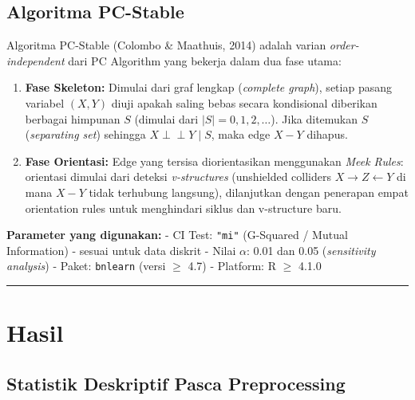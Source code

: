 \documentclass[
  11pt,
]{article}
\begin{document}
\subsection{Algoritma PC-Stable}\label{algoritma-pc-stable}

Algoritma PC-Stable (Colombo \& Maathuis, 2014) adalah varian
\emph{order-independent} dari PC Algorithm yang bekerja dalam dua fase
utama:

\begin{enumerate}
\def\labelenumi{\arabic{enumi}.}
\item
  \textbf{Fase Skeleton:} Dimulai dari graf lengkap (\emph{complete
  graph}), setiap pasang variabel \((X, Y)\) diuji apakah saling bebas
  secara kondisional diberikan berbagai himpunan \(S\) (dimulai dari
  \(|S|=0, 1, 2, \ldots\)). Jika ditemukan \(S\) (\emph{separating set})
  sehingga \(X \perp\!\!\!\perp Y \mid S\), maka edge \(X-Y\) dihapus.
\item
  \textbf{Fase Orientasi:} Edge yang tersisa diorientasikan menggunakan
  \emph{Meek Rules}: orientasi dimulai dari deteksi \emph{v-structures}
  (unshielded colliders \(X \to Z \leftarrow Y\) di mana \(X-Y\) tidak
  terhubung langsung), dilanjutkan dengan penerapan empat orientation
  rules untuk menghindari siklus dan v-structure baru.
\end{enumerate}

\textbf{Parameter yang digunakan:} - CI Test: \texttt{"mi"} (G-Squared /
Mutual Information) - sesuai untuk data diskrit - Nilai \(\alpha\): 0.01
dan 0.05 (\emph{sensitivity analysis}) - Paket: \texttt{bnlearn} (versi
\(\geq\) 4.7) - Platform: R \(\geq\) 4.1.0

\begin{center}\rule{0.5\linewidth}{0.5pt}\end{center}

\section{Hasil}\label{hasil}

\subsection{Statistik Deskriptif Pasca
Preprocessing}\label{statistik-deskriptif-pasca-preprocessing}
\end{document}
